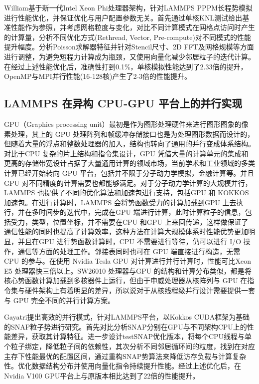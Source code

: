 William\cite{mcdoniel2017lammps}基于新一代Intel Xeon Phi处理器架构，针对LAMMPS PPPM长程势模拟进行性能优化，并保证优化与用户配置参数无关。首先通过单核KNL测试给出基准性能作为参照，并考虑网格粒度与变化，对比不同计算模式在网格点访问时产生的计算量，分析不同优化方式(Rethread, Vector, Pre-compute)对不同模式的性能提升幅度。分析Poisson求解器特征并针对Stencil尺寸、2D FFT及网格规模等方面进行调整，为避免短程力计算成为瓶颈，又使用向量化减少邻居粒子的迭代计算。在经过上述性能优化后，准确性打到0.1\%，单核模拟性能达到了2.33倍的提升，OpenMP与MPI并行性能(16-128核)产生了2-3倍的性能提升。

\subsection{LAMMPS 在异构 CPU-GPU 平台上的并行实现}
GPU（Graphics processing unit）最初是作为图形处理硬件来进行图形图象的像素处理，其上的 GPU 处理阵列和帧缓冲存储接口也是为处理图形数据而设计的，但随着大量的浮点和整数处理器的加入，结构也转向了通用的并行变成体系结构。对比于CPU 复杂的片上结构和指令集设计，GPU 凭借大量的计算单元的集成和更高的存储带宽设计占据了大量通用计算的领域市场，当前学术和工业领域的多类计算已经开始转向 GPU 平台，包括并不限于分子动力学模拟，金融计算等。并且 GPU 对不同精度的计算需要也都能够满足。对于分子动力学计算的大规模并行，LAMMPS 也提供了不同的优化算法和加速包进行支持，包括GPU 和 KOKKOS 加速包。在进行计算时，LAMMPS 会将势函数受力的计算加载到GPU 上去执行，并在多时间步的迭代中，完成在GPU 端进行计算，此时计算粒子的信息，包括受力，类型，位置坐标，并不需要在CPU 和GPU 上来回传递，这样做保证了通信性能的同时也提高了计算效率，这种方法在计算大规模体系时性能优势更加明显，并且在GPU 进行势函数计算时，CPU 不需要进行等待，仍可以进行 I/O 操作，通信等方面的处理工作。邻接表同时也可在 GPU 端直接进行构造，无需 CPU 的参与。在使用 Nvidia Tesla GPU 对计算进行并行计算时，性能可比Xeon E5 处理器快三倍以上。SW26010 处理器与GPU 的结构和计算分布类似，都是将核心势函数计算加载到多核器件上运行，但由于申威处理器从核阵列与 GPU 在指令集与硬件架构上有着明显的差异，所以说对于从核线程级并行设计需要提供一套与 GPU 完全不同的并行计算方案。

Gayatri\cite{gayatri2020rapid}提出高效的并行模式，针对LAMMPS平台，以Kokkos CUDA框架为基础的SNAP粒子势进行研究。首先对比分析SNAP分别在GPU与不同架构CPU上的性能差异，获取其计算特征。进一步设计testSNAP优化版本，将每个CPU线程与单个粒子绑定，降低粒子间的依赖性，其次分析不同邻居循环间的粒度，找到在对应主存下性能最优的配置区间，通过重构SNAP势算法来降低访存负载与计算复杂性。优化数据结构分布并使用向量化指令持续提升性能。经过上述优化后，在Nvidia V100 GPU平台上与原版本相比达到了22倍的性能提升。

